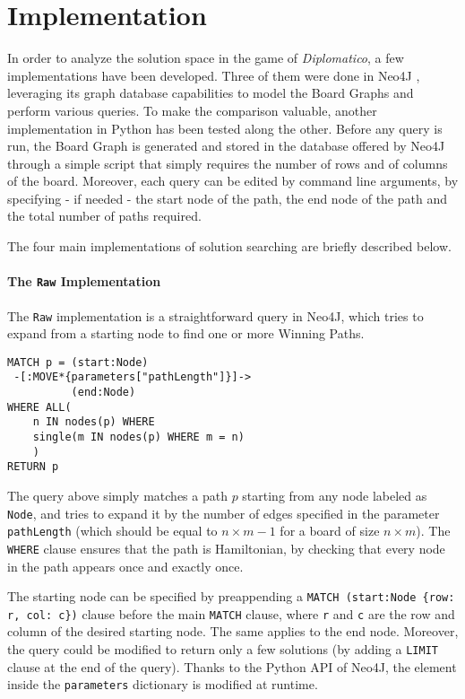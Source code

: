 \documentclass[conference]{IEEEtran}
\begin{document}
\section{Implementation}									\label{sec:implementation}
In order to analyze the solution space in the game of \textit{Diplomatico}, a few implementations have been developed.
Three of them were done in Neo4J \cite{neo4j}, leveraging its graph database capabilities to model the Board Graphs and perform various queries. To make the comparison valuable, another implementation in Python has been tested along the other.
Before any query is run, the Board Graph is generated and stored in the database offered by Neo4J through a simple script that simply requires the number of rows and of columns of the board.
Moreover, each query can be edited by command line arguments, by specifying - if needed - the start node of the path, the end node of the path and the total number of paths required.

The four main implementations of solution searching are briefly described below.

\paragraph{The \texttt{Raw} Implementation}
The \texttt{Raw} implementation is a straightforward query in Neo4J, which tries to expand from a starting node to find one or more Winning Paths.

\begin{tcolorbox}[colback=yellow!5!white, colframe=yellow!50!black]
\begin{verbatim}
MATCH p = (start:Node)
 -[:MOVE*{parameters["pathLength"]}]->
          (end:Node)
WHERE ALL(
    n IN nodes(p) WHERE 
    single(m IN nodes(p) WHERE m = n)
    )
RETURN p
\end{verbatim}
\end{tcolorbox}

The query above simply matches a path $p$ starting from any node labeled as \texttt{Node}, and tries to expand it by the number of edges specified in the parameter \texttt{pathLength} (which should be equal to $n \times m - 1$ for a board of size $n \times m$).
The \texttt{WHERE} clause ensures that the path is Hamiltonian, by checking that every node in the path appears once and exactly once.

The starting node can be specified by preappending a \texttt{MATCH (start:Node \{row: r, col: c\})} clause before the main \texttt{MATCH} clause, where \texttt{r} and \texttt{c} are the row and column of the desired starting node. The same applies to the end node.
Moreover, the query could be modified to return only a few solutions (by adding a \texttt{LIMIT} clause at the end of the query).
Thanks to the Python API of Neo4J, the element inside the \texttt{parameters} dictionary is modified at runtime.
\end{document}
